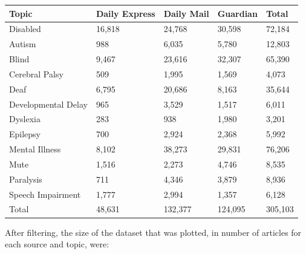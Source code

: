 \documentclass{report}
\begin{document}
\begin{center}
	\begin{tabu} to 1.0\textwidth { | X[c] | X[c] | X[c] | X[c] | X[c] | }
		\hline
		Topic & Daily Express & Daily Mail & Guardian & Total \\
		\hline
		Disabled & 16,818 & 24,768 & 30,598 & 72,184  \\
		\hline
		Autism & 988 & 6,035 & 5,780 & 12,803  \\
		\hline
		Blind & 9,467 & 23,616 & 32,307 & 65,390  \\
		\hline
		Cerebral Palsy & 509 & 1,995 & 1,569 & 4,073  \\
		\hline
		Deaf & 6,795 & 20,686 & 8,163 & 35,644  \\
		\hline
		Developmental Delay & 965 & 3,529 & 1,517 & 6,011  \\
		\hline
		Dyslexia & 283 & 938 & 1,980 & 3,201  \\
		\hline
		Epilepsy & 700 & 2,924 & 2,368 & 5,992  \\
		\hline
		Mental Illness & 8,102 & 38,273 & 29,831 & 76,206  \\
		\hline
		Mute & 1,516 & 2,273 & 4,746 & 8,535  \\ %
		\hline
		Paralysis & 711 & 4,346 & 3,879 & 8,936  \\
		\hline
		Speech Impairment & 1,777 & 2,994 & 1,357 & 6,128  \\
		\hline
		Total & 48,631 & 132,377 & 124,095 & 305,103  \\ %
		\hline
	\end{tabu}
\end{center}

After filtering, the size of the dataset that was plotted, in number of articles for each source and topic,  were:
\end{document}
